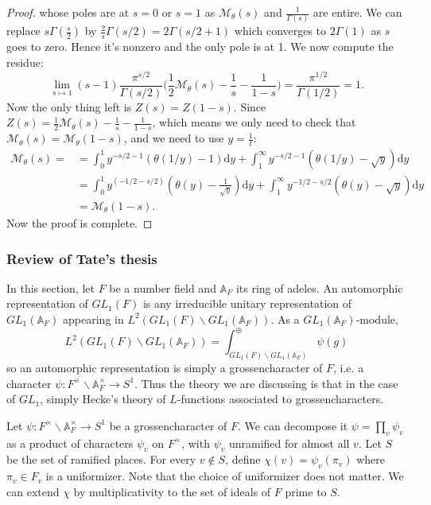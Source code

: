 \documentclass[12pt,a4paper,english]{article}
\theoremstyle{plain}
\theoremstyle{definition}
\begin{document}
\begin{proof}
whose poles are at $s=0$ or $s=1$ as $\mathcal{M}_{\theta}(s) $ and $\frac{1}{\Gamma(s)}$ are entire. We can replace $s\Gamma(\frac{s}{2})$ by $\frac{2}{s}\Gamma(s/2)=2\Gamma(s/2+1)$ which converges to $2\Gamma(1)$ as $s$ goes to zero. Hence it's nonzero and the only pole is at 1. We now compute the residue:
\begin{equation*}
    \lim_{s\mapsto 1}(s-1)\frac{\pi^{s/2}}{\Gamma(s/2)}\bigg(\frac{1}{2}\mathcal{M}_{\theta}(s)-\frac{1}{s}-\frac{1}{1-s}\bigg)=\frac{\pi^{1/2}}{\Gamma(1/2)}=1.
\end{equation*}
Now the only thing left is $Z(s)=Z(1-s)$. Since $Z(s)=\frac{1}{2}\mathcal{M}_{\theta}(s)-\frac{1}{s}-\frac{1}{1-s}$, which means we only need to check that $\mathcal{M}_{\theta}(s)=\mathcal{M}_{\theta}(1-s)$, and we need to use $y=\frac{1}{t}$:
\begin{align*}
        \mathcal{M}_{\theta}(s)=
        &= \int^{1}_{0}y^{-s/2-1}(\theta(1/y)-1)\text{d}y+\int^{\infty}_{1}y^{-s/2-1}(\theta(1/y)-\sqrt{y})\text{d}y\\
        &= \int^{1}_{0}y^{(-1/2-s/2)}(\theta(y)-\frac{1}{\sqrt{y}})\text{d}y+\int^{\infty}_{1}y^{-1/2-s/2}(\theta(y)-\sqrt{y})\text{d}y\\
        &=\mathcal{M}_{\theta}(1-s).
\end{align*}
Now the proof is complete.
\end{proof}
\subsubsection{Review of Tate's thesis}

In this section, let $F$ be a number field and $\mathbb{A}_{F}$ its ring of adeles. An automorphic representation of $GL_{1}(F)$ is any irreducible unitary representation of $GL_{1}(\mathbb{A}_{F})$ appearing in $L^{2}(GL_{1}(F)\backslash GL_{1}(\mathbb{A}_{F}))$. As a $GL_{1}(\mathbb{A}_{F})$-module,
\begin{equation*}
    L^{2}(GL_{1}(F)\backslash GL_{1}(\mathbb{A}_{F}))=\int^{\oplus}_{GL_{1}(F)\backslash GL_{1}(\mathbb{A}_{F})}\psi(g)
\end{equation*}
so an automorphic representation is simply a grossencharacter of $F$, i.e.  a character $\psi:F^{\times}\backslash \mathbb{A}_{F}^{\times}\rightarrow S^{1}$. Thus the theory we are discussing is that in the case of $GL_{1}$, simply Hecke's theory of $L$-functions associated to grossencharacters. 

Let $\psi: F^{\times}\backslash \mathbb{A}_{F}^{\times}\rightarrow S^{1}$ be a grossencharacter of $F$. We can decompose it $\psi=\prod_{v}\psi_{v}$ as a product of characters $\psi_{v}$ on $F^{\times}$, with $\psi_{v}$ unramified for almost all $v$. Let $S$ be the set of ramified places. For every $v\not\in S$, define $\chi(v)=\psi_{v}(\pi_{v})$ where $\pi_{v}\in F_{v}$ is a uniformizer. Note that the choice of uniformizer does not matter. We can extend $\chi$ by multiplicativity to the set of ideals of $F$ prime to $S$. 
\end{document}
